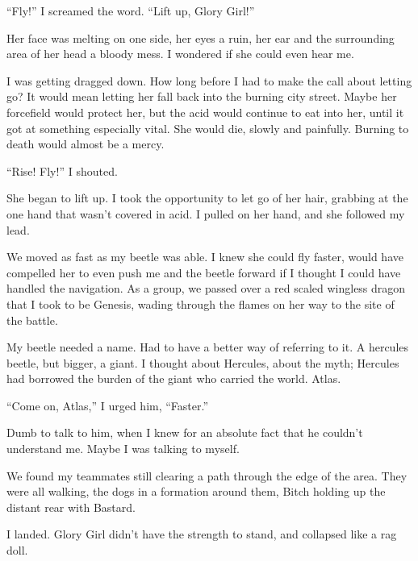 ``Fly!'' I screamed the word.  ``Lift up, Glory Girl!''



Her face was melting on one side, her eyes a ruin, her ear and the surrounding area of her head a bloody mess.  I wondered if she could even hear me.



I was getting dragged down.  How long before I had to make the call about letting go?  It would mean letting her fall back into the burning city street.  Maybe her forcefield would protect her, but the acid would continue to eat into her, until it got at something especially vital.  She would die, slowly and painfully.  Burning to death would almost be a mercy.



``Rise!  Fly!''  I shouted.



She began to lift up.  I took the opportunity to let go of her hair, grabbing at the one hand that wasn't covered in acid.  I pulled on her hand, and she followed my lead.



We moved as fast as my beetle was able.  I knew she could fly faster, would have compelled her to even push me and the beetle forward if I thought I could have handled the navigation.  As a group, we passed over a red scaled wingless dragon that I took to be Genesis, wading through the flames on her way to the site of the battle.



My beetle needed a name.  Had to have a better way of referring to it.  A hercules beetle, but bigger, a giant.  I thought about Hercules, about the myth; Hercules had borrowed the burden of the giant who carried the world.  Atlas.



``Come on, Atlas,'' I urged him, ``Faster.''



Dumb to talk to him, when I knew for an absolute fact that he couldn't understand me.  Maybe I was talking to myself.



We found my teammates still clearing a path through the edge of the area.  They were all walking, the dogs in a formation around them, Bitch holding up the distant rear with Bastard.



I landed.  Glory Girl didn't have the strength to stand, and collapsed like a rag doll.



